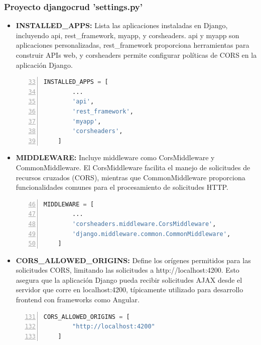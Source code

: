 \documentclass{article}
\begin{document}
  \subsubsection{Proyecto djangocrud 'settings.py'}
  \begin{itemize}
    \item \textbf{INSTALLED\_APPS: }Lista las aplicaciones instaladas en Django, incluyendo api, rest\_framework, 
    myapp, y corsheaders. api y myapp son aplicaciones personalizadas, rest\_framework proporciona herramientas 
    para construir APIs web, y corsheaders permite configurar políticas de CORS en la aplicación Django.   
    \begin{lstlisting}[language=python, numbers=left, firstnumber=33, numberstyle=\color{blue}]
    INSTALLED_APPS = [ 
        ...
        'api',
        'rest_framework',
        'myapp',
        'corsheaders',
    ]
    \end{lstlisting}
    \item \textbf{MIDDLEWARE: }Incluye middleware como CorsMiddleware y CommonMiddleware. El CorsMiddleware 
    facilita el manejo de solicitudes de recursos cruzados (CORS), mientras que CommonMiddleware proporciona 
    funcionalidades comunes para el procesamiento de solicitudes HTTP.
    \begin{lstlisting}[language=python, numbers=left, firstnumber=46, numberstyle=\color{blue}]
    MIDDLEWARE = [
        ...
        'corsheaders.middleware.CorsMiddleware',
        'django.middleware.common.CommonMiddleware',
    ]
    \end{lstlisting}
    \item \textbf{CORS\_ALLOWED\_ORIGINS: }Define los orígenes permitidos para las solicitudes CORS, limitando las solicitudes a 
    http://localhost:4200. Esto asegura que la aplicación Django pueda recibir solicitudes AJAX desde el servidor que 
    corre en localhost:4200, típicamente utilizado para desarrollo frontend con frameworks como Angular.
    \begin{lstlisting}[language=python, numbers=left, firstnumber=131, numberstyle=\color{blue}]
    CORS_ALLOWED_ORIGINS = [
        "http://localhost:4200"
    ]
    \end{lstlisting}
  \end{itemize}
\end{document}
